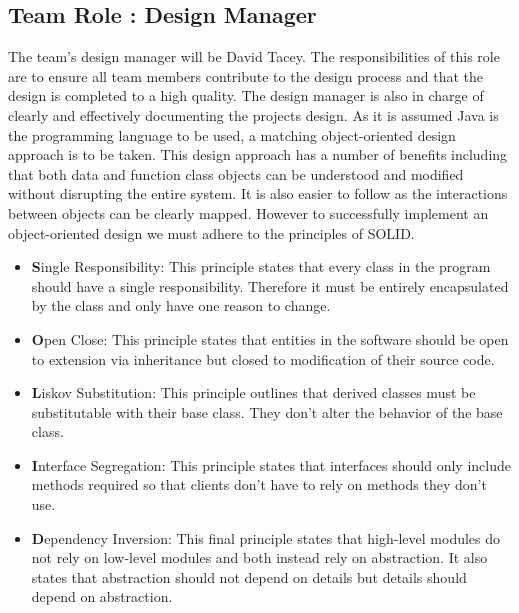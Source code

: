\documentclass{article}
\begin{document}
\subsection{Team Role : Design Manager}
The team's design manager will be David Tacey. The responsibilities of this role are to ensure all team members contribute to the design process and that the design is completed to a high quality. The design manager is also in charge of clearly and effectively documenting the projects design. As it is assumed Java is the programming language to be used, a matching object-oriented design approach is to be taken. This design approach has a number of benefits including that both data and function class objects can be understood and modified without disrupting the entire system. It is also easier to follow as the interactions between objects can be clearly mapped. However to successfully implement an object-oriented design we must adhere to the principles of SOLID.  
\begin{itemize}
 \item \textbf{S}ingle Responsibility: This principle states that every class in the program should have a single responsibility. Therefore it must be entirely encapsulated by the class and only have one reason to change. 
 \item \textbf{O}pen Close: This principle states that entities in the software should be open to extension via inheritance but closed to modification of their source code. 
 \item \textbf{L}iskov Substitution: This principle outlines that derived classes must be substitutable with their base class. They don't alter the behavior of the base class.
 \item \textbf{I}nterface Segregation: This principle states that interfaces should only include methods required so that clients don't have to rely on methods they don't use.
 \item \textbf{D}ependency Inversion: This final principle states that high-level modules do not rely on low-level modules and both instead rely on abstraction. It also states that abstraction should not depend on details but details should depend on abstraction.
 
\end{itemize}
\end{document}
